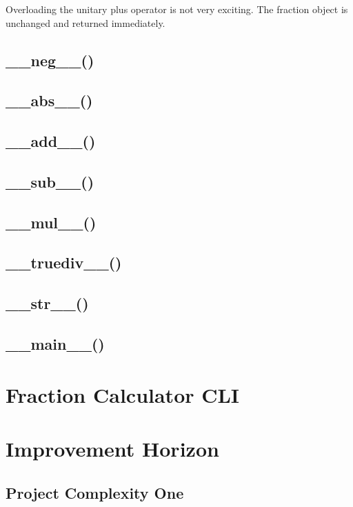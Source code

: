 \documentclass[refman]{scrartcl}
\begin{document}
Overloading the unitary plus operator is not very exciting. The fraction object is unchanged and returned immediately.

\subsection{\_\_neg\_\_()}

\subsection{\_\_abs\_\_()}

\subsection{\_\_add\_\_()}

\subsection{\_\_sub\_\_()}

\subsection{\_\_mul\_\_()}

\subsection{\_\_truediv\_\_()}

\subsection{\_\_str\_\_()}

\subsection{\_\_main\_\_()}

\section{Fraction Calculator CLI}

\section{Improvement Horizon}

\subsection{Project Complexity One}

\subsection{}
\end{document}
